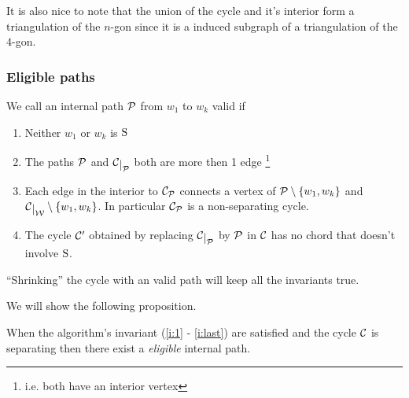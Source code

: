 It is also nice to note that the union of the cycle and it's interior form a triangulation of the $n$-gon since it is a induced subgraph of a triangulation of the $4$-gon.


\subsubsection{Eligible paths}



\begin{defi}
We call an internal path $\P$ from $w_1$ to $w_k$ valid if
\begin{enumerate}
 \renewcommand*{\labelenumi}{(E\arabic{enumi})}%
 \renewcommand*{\theenumi}{(E\arabic{enumi})}%


\item Neither $w_1$ or $w_k$ is $\pS$
\label{e:noS}

\item The paths $\P$ and $\restC \P$ both are more then 1 edge \footnote{i.e. both have an interior vertex}
\label{e:longBorders}

\item Each edge in the interior to $\C_\P$ connects a vertex of $\P\setminus{\braces{w_1,w_k}}$ and $\restC \W \setminus{\braces{w_1,w_k}}$. In particular $\C_\P$ is a non-separating cycle.
\label{e:crossingEdges}

\item The cycle $\C'$ obtained by replacing $\restC \P$ by $\P$ in $\C$ has no chord that doesn't involve $\pS$.
\label{e:noNewChord}

\end{enumerate}
\end{defi}

\begin{remark}
``Shrinking'' the cycle with an valid path will keep all the invariants true.
\end{remark}

We will show the following proposition.


\begin{thrm}
\label{th:eligExistence}
When the algorithm's invariant (\ref{i:1} - \ref{i:last}) are satisfied and the cycle $\C$ is separating then there exist a \emph{eligible} internal path.
\end{thrm}

